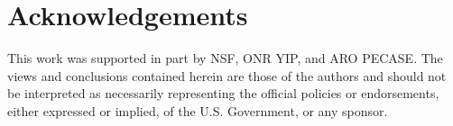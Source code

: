 \section{Acknowledgements}

This work was supported in part by NSF, ONR YIP, and ARO PECASE. The views and conclusions contained herein are those of the authors and should not be interpreted as necessarily representing the official policies or endorsements, either expressed or implied, of the U.S. Government, or any sponsor. 

